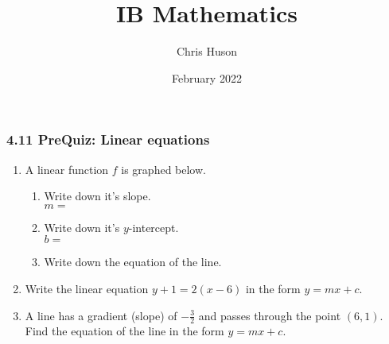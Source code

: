 \documentclass[12pt, twoside]{article}
\title{IB Mathematics}
\author{Chris Huson}
\date{February 2022}
\begin{document}
\subsubsection*{4.11 PreQuiz: Linear equations}
\begin{enumerate}
    \item A linear function $f$ is graphed below.
    \begin{multicols}{2}
    \begin{enumerate}
      \item Write down it's slope.\\ $m=$
      \vspace{0.25cm}
      \item Write down it's $y$-intercept.\\ $b=$
      \vspace{0.25cm}
      \item Write down the equation of the line.
    \end{enumerate} \vspace{.5cm}
      \begin{center} 
      \end{center}
    \end{multicols} \vspace{1cm}
    
    \item Write the linear equation $y+1=2(x-6)$ in the form $y=mx+c$. \vspace{4cm}
    
    \item A line has a gradient (slope) of $\displaystyle -\frac{3}{2}$ and passes through the point $(6, 1)$. Find the equation of the line in the form $y=mx+c$.
    

\end{enumerate}
\end{document}
